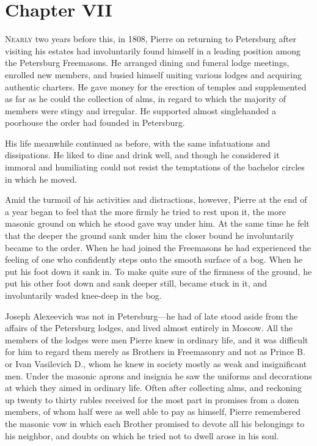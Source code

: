 \chapter*{Chapter VII}
\ifaudio     
{} 
\fi

\lettrine[lines=2, loversize=0.3, lraise=0]{\initfamily N}{early}
two years before this, in 1808, Pierre on returning to
Petersburg after visiting his estates had involuntarily found
himself in a leading position among the Petersburg Freemasons. He
arranged dining and funeral lodge meetings, enrolled new members,
and busied himself uniting various lodges and acquiring authentic
charters. He gave money for the erection of temples and
supplemented as far as he could the collection of alms, in regard
to which the majority of members were stingy and irregular. He
supported almost singlehanded a poorhouse the order had founded
in Petersburg.

His life meanwhile continued as before, with the same
infatuations and dissipations. He liked to dine and drink well,
and though he considered it immoral and humiliating could not
resist the temptations of the bachelor circles in which he moved.

Amid the turmoil of his activities and distractions, however,
Pierre at the end of a year began to feel that the more firmly he
tried to rest upon it, the more masonic ground on which he stood
gave way under him.  At the same time he felt that the deeper the
ground sank under him the closer bound he involuntarily became to
the order. When he had joined the Freemasons he had experienced
the feeling of one who confidently steps onto the smooth surface
of a bog. When he put his foot down it sank in. To make quite
sure of the firmness of the ground, he put his other foot down
and sank deeper still, became stuck in it, and involuntarily
waded knee-deep in the bog.

Joseph Alexeevich was not in Petersburg---he had of late stood
aside from the affairs of the Petersburg lodges, and lived almost
entirely in Moscow. All the members of the lodges were men Pierre
knew in ordinary life, and it was difficult for him to regard
them merely as Brothers in Freemasonry and not as Prince B. or
Ivan Vasilevich D., whom he knew in society mostly as weak and
insignificant men. Under the masonic aprons and insignia he saw
the uniforms and decorations at which they aimed in ordinary
life. Often after collecting alms, and reckoning up twenty to
thirty rubles received for the most part in promises from a dozen
members, of whom half were as well able to pay as himself, Pierre
remembered the masonic vow in which each Brother promised to
devote all his belongings to his neighbor, and doubts on which he
tried not to dwell arose in his soul.

